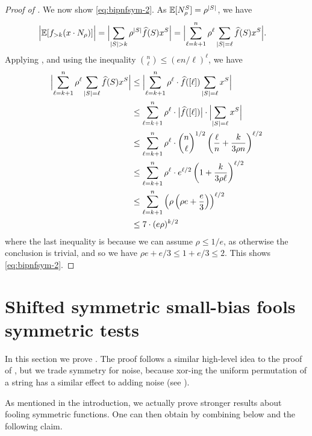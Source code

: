 \documentclass[10pt,a4paper]{article}
\theoremstyle{definition}
\newcommand{\E}{\mathop{\mathbb{E}\/}}
\newcommand{\wh}[1]{\widehat{#1}}
\newcommand{\hf}{\wh{f}}
\DeclarePairedDelimiter\abs{\lvert}{\rvert}
\begin{document}
\begin{proof}[Proof of ]
  We now show \cref{eq:bipnfsym-2}.
  As $\E[N_\rho^S] = \rho^{\abs{S}}$, we have
  \begin{align*}
    \abs[\Big]{\E[f_{>k}(x \cdot N_\rho)]}
    = \abs[\Big]{ \sum_{\abs{S} > k} \rho^{\abs{S}} \hf(S) x^S }
    &=  \abs[\Big]{ \sum_{\ell=k+1}^n \rho^\ell \sum_{\abs{S}=\ell} \hf(S) x^S } .
  \end{align*}
  Applying , and using the inequality $\binom{n}{\ell} \le (en/\ell)^\ell$, we have
  \begin{align*}
    \abs[\Big]{ \sum_{\ell=k+1}^n \rho^\ell \sum_{\abs{S}=\ell} \hf(S) x^S }
    &\le \abs[\Big]{ \sum_{\ell=k+1}^n \rho^\ell \cdot \hf([\ell]) \sum_{\abs{S}=\ell} x^S } \\
    &\le \sum_{\ell=k+1}^n \rho^\ell \cdot \abs[\big]{\hf([\ell])} \cdot  \abs[\Big]{ \sum_{\abs{S}=\ell} x^S } \\
    &\le \sum_{\ell=k+1}^n \rho^\ell \cdot \binom{n}{\ell}^{1/2}  \left( \frac{\ell}{n} + \frac{k}{3\rho n} \right)^{\ell/2} \\
    &\le \sum_{\ell=k+1}^n \rho^\ell \cdot e^{\ell/2} \left(  1 + \frac{k}{3\rho \ell} \right)^{\ell/2} \\
    &\le \sum_{\ell=k+1}^n \left( \rho \left(  \rho e + \frac{e}{3} \right) \right)^{\ell/2} \\
    &\le 7 \cdot (e\rho)^{k/2}
  \end{align*}
  where the last inequality is because we can assume $\rho \le 1/e$, as otherwise the conclusion is trivial, and so we have $\rho e + e/3 \le 1 + e/3 \le 2$.
  This shows \cref{eq:bipnfsym-2}.
\end{proof}

\section{Shifted symmetric small-bias fools symmetric tests} \label{sec:shifted-sym-small-bias}

In this section we prove .  The proof follows a similar high-level idea to the proof of , but we trade symmetry for noise, because xor-ing the uniform permutation of a string has a similar effect to adding noise (see ).

As mentioned in the introduction, we actually prove stronger results about fooling symmetric functions.
One can then obtain  by combining  below and the following claim.
\end{document}
